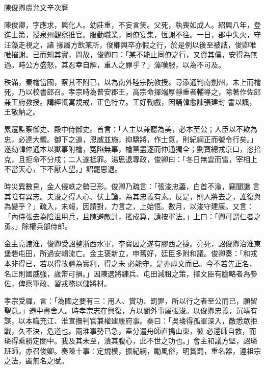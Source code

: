 
\begin{pinyinscope}

 陳俊卿虞允文辛次膺



 陳俊卿，字應求，興化人。幼莊重，不妄言笑。父死，執喪如成人。紹興八年，登進士第，授泉州觀察推官。服勤職業，同僚宴集，恆謝不往。一日，郡中失火，守汪藻走視之，諸
 掾屬方飲某所，俊卿輿卒亦假之行，於是例以後至被詰，俊卿唯唯摧謝。已而知其實，問故，俊卿曰：「某不能止同僚之行，又資其僕，安得為無過。時公方盛怒，其忍幸自解，重人之罪乎？」藻嘆服，以為不可及。



 秩滿，秦檜當國，察其不附已，以為南外睦宗院教授。尋添通判南劍州，未上而檜死，乃以校書郎召。孝宗時為普安郡王，高宗命擇端厚靜重者輔導之，除著作佐郎兼王府教授。講經輒寓規戒，正色特立。王好鞠戲，因誦韓愈諫張建封
 書以諷，王敬納之。



 累遷監察御史、殿中侍御史。首言：「人主以兼聽為美，必本至公；人臣以不欺為忠，必達大體。御下之道，恩威並施，抑驕將，作士氣，則紀綱正而號令行矣。」遂劾韓仲通本以獄事附檜，冤陷無辜，檜黨盡逐而仲通獨全；劉寶總戎京口，恣掊克，且拒命不分戍；二人遂抵罪。湯思退專政，俊卿曰：「冬日無雲而雷，宰相上不當天心，下不厭人望。」詔罷思退。



 時災異數見，金人侵軼之勢已形。俊卿乃疏言：「張浚忠藎，白首不渝，竊聞讒
 言其陰有異志。夫浚之得人心、伏士論，為其忠義有素。反是，則人將去之，誰復與為變乎？」疏入，未報，因請對，力言之，上始悟。數月，以浚守建康。又言：「內侍張去為陰沮用兵，且陳避敵計，搖成算，請按軍法。」上曰：「卿可謂仁者之勇。」除權兵部侍郎。



 金主亮渡淮，俊卿受詔整浙西水軍，李寶因之遂有膠西之捷。亮死，詔俊卿治淮東堡砦屯田，所過安輯流亡。金主褒新立，申舊好，廷臣多附和議。俊卿奏：「和戎本非得已，若以得故疆為實利，得之未
 必能守，是亦虛文而已。今不若先正名，名正則國威強，歲幣可損。」因陳選將練兵、屯田減租之策，擇文臣有膽略者為參佐，俾察軍政、習戎務以儲將材。



 孝宗受禪，言：「為國之要有三：用人、賞功、罰罪，所以行之者至公而已，願留聖意。」遷中書舍人。時孝宗志在興復，方以閫外事屬張浚。以俊卿忠義，沉靖有謀，以本職充江、淮宣撫判官兼權建康府事。奏曰：「吳璘得孤軍深入，敵悉眾拒戰，久不決，危道也。兩淮事勢已急，盍分遣舟師直搗山東，彼
 必還師自救，而璘得乘勝定關中。我及其未至，潰其腹心，此不世之功也。」會主和議方堅，詔璘班師，亦召俊卿。奏陳十事：定規模，振紀綱，勵風俗，明賞罰，重名器，遵祖宗之法，蠲無名之賦。




\end{pinyinscope}
